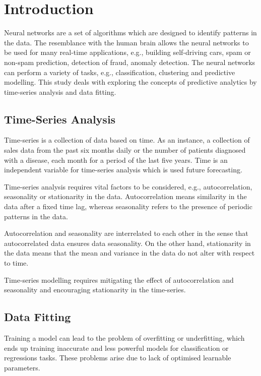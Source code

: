 \section{Introduction}

Neural networks are a set of algorithms which are designed to identify patterns in the data. The resemblance with the human brain allows the neural networks to be used for many real-time applications, e.g., building self-driving cars, spam or non-spam prediction, detection of fraud, anomaly detection. The neural networks can perform a variety of tasks, e.g.,  classification, clustering and predictive modelling. This study deals with exploring the concepts of predictive analytics by time-series analysis and data fitting.

\subsection{Time-Series Analysis}

Time-series is a collection of data based on time. As an instance, a collection of sales data from the past six months daily or the number of patients diagnosed with a disease, each month for a period of the last five years. Time is an independent variable for time-series analysis which is used future forecasting.

Time-series analysis requires vital factors to be considered, e.g., autocorrelation, seasonality or stationarity in the data. Autocorrelation means similarity in the data after a fixed time lag, whereas seasonality refers to the presence of periodic patterns in the data. 

Autocorrelation and seasonality are interrelated to each other in the sense that autocorrelated data ensures data seasonality. On the other hand, stationarity in the data means that the mean and variance in the data do not alter with respect to time. 

Time-series modelling requires mitigating the effect of autocorrelation and seasonality and encouraging stationarity in the time-series.

\subsection{Data Fitting}

Training a model can lead to the problem of overfitting or underfitting, which ends up training inaccurate and less powerful models for classification or regressions tasks.  These problems arise due to lack of optimised learnable parameters. 

